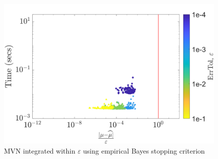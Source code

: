 \documentclass[twocolumn]{svjour3}          %
\begin{document}
\begin{figure}
	\centering
	\includegraphics[width=0.95\linewidth]{"figures/MVN_guaranteed_time_MLE_C0_29-Jul-2018 02-13-31"}
	\caption[Guaranteed:]{MVN integrated within $\varepsilon$ using empirical Bayes stopping criterion}
	\label{fig:mvn-guaranteed-MLE}
\end{figure}
\end{document}
